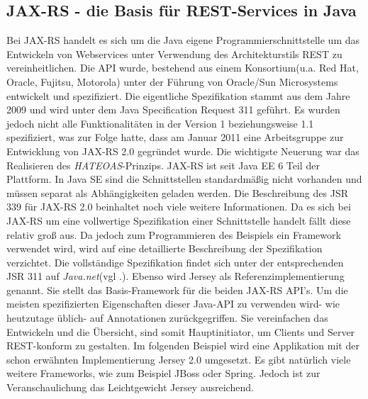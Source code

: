 \documentclass[fleqn,10.5pt,ngerman]{SelfArx}
\begin{document}
\subsection{JAX-RS - die Basis für REST-Services in Java}
Bei JAX-RS handelt es sich um die Java eigene Programmierschnittstelle um das Entwickeln von Webservices unter Verwendung des Architekturstils REST zu vereinheitlichen. Die API wurde, bestehend aus einem Konsortium(u.a. Red Hat, Oracle, Fujitsu, Motorola) unter der Führung von Oracle/Sun Microsystems entwickelt und spezifiziert. Die eigentliche Spezifikation \cite{jaxrs1.1} stammt aus dem Jahre 2009 und wird unter dem Java Specification Request \cite{spezreq} 311 geführt. Es wurden jedoch nicht alle Funktionalitäten in der Version 1 beziehungsweise 1.1 spezifiziert, was zur Folge hatte, dass am Januar 2011 eine Arbeitsgruppe zur Entwicklung von JAX-RS 2.0 gegründet wurde. Die wichtigste Neuerung war das Realisieren des \textit{HATEOAS}-Prinzips. JAX-RS ist seit Java EE 6 Teil der Plattform. In Java SE sind die Schnittstellen standardmäßig nicht vorhanden und müssen separat als Abhängigkeiten geladen werden. Die Beschreibung des JSR 339 für JAX-RS 2.0 \cite{spezJSR339} beinhaltet noch viele weitere Informationen. Da es sich bei JAX-RS um eine vollwertige Spezifikation einer Schnittstelle handelt fällt diese relativ groß aus. Da jedoch zum Programmieren des Beispiels ein Framework verwendet wird, wird auf eine detaillierte Beschreibung der Spezifikation verzichtet. Die vollständige Spezifikation findet sich unter der entsprechenden JSR 311 auf \textit{Java.net}(vgl .\cite{jaxrs1.1}). Ebenso wird Jersey \cite{jersey} als Referenzimplementierung genannt. Sie stellt das Basis-Framework für die beiden JAX-RS API's. Um die meisten spezifizierten Eigenschaften dieser Java-API zu verwenden wird- wie heutzutage üblich- auf Annotationen zurückgegriffen. Sie vereinfachen das Entwickeln und die Übersicht, sind somit Hauptinitiator, um Clients und Server REST-konform zu gestalten. Im folgenden Beispiel wird eine Applikation mit der schon erwähnten Implementierung Jersey 2.0 umgesetzt. Es gibt natürlich viele weitere Frameworks, wie zum Beispiel JBoss oder Spring. Jedoch ist zur Veranschaulichung das Leichtgewicht Jersey ausreichend.
\end{document}
